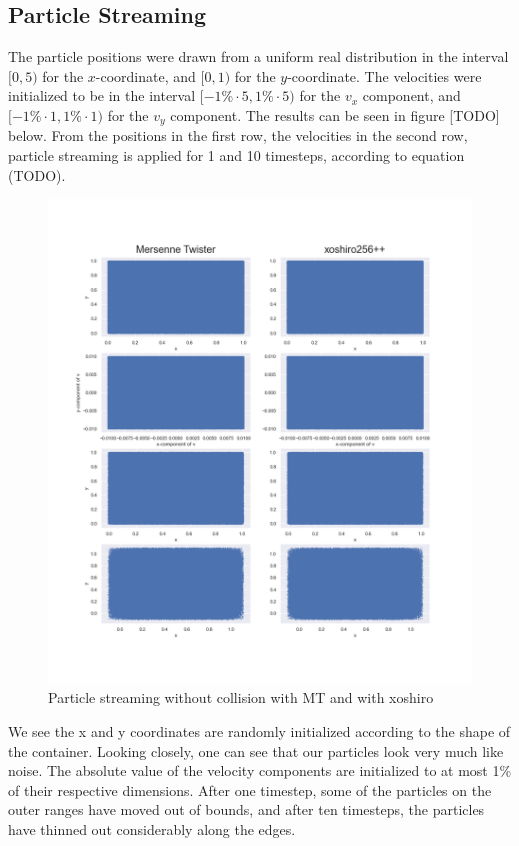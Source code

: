\documentclass[
]{article}
\begin{document}
\hypertarget{particle-streaming}{%
\subsection{Particle Streaming}\label{particle-streaming}}

The particle positions were drawn from a uniform real distribution in
the interval \([0, 5)\) for the \(x\)-coordinate, and \([0, 1)\) for the
\(y\)-coordinate. The velocities were initialized to be in the interval
\([-1\% \cdot 5, 1\% \cdot 5)\) for the \(v_x\) component, and
\([-1\% \cdot 1, 1\% \cdot 1)\) for the \(v_y\) component. The results
can be seen in figure {[}TODO{]} below. From the positions in the first
row, the velocities in the second row, particle streaming is applied for
1 and 10 timesteps, according to equation (TODO).

\begin{figure}
\centering
\includegraphics{Assets/particle_streaming.png}
\caption{Particle streaming without collision with MT and with xoshiro}
\end{figure}

We see the x and y coordinates are randomly initialized according to the
shape of the container. Looking closely, one can see that our particles
look very much like noise. The absolute value of the velocity components
are initialized to at most 1\% of their respective dimensions. After one
timestep, some of the particles on the outer ranges have moved out of
bounds, and after ten timesteps, the particles have thinned out
considerably along the edges.
\end{document}
